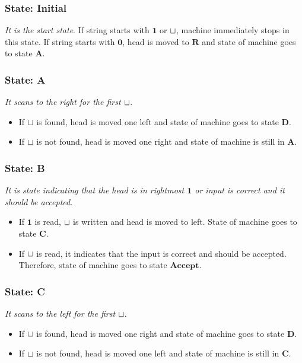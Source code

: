 \subsubsection*{State: Initial}
\label{q1-state:initial}

\textit{It is the start state}. If string starts with $\mathbf{1}$ or $\sqcup$, machine immediately stops in this state. If string starts with $\mathbf{0}$, head is moved to $\mathbf{R}$ and state of machine goes to state \hyperref[q1-state:A]{$\mathbf{A}$}.

\subsubsection*{State: A}
\label{q1-state:A}

\textit{It scans to the right for the first $\sqcup$}.
\begin{itemize}
  \item If $\sqcup$ is found, head is moved one left and state of machine goes to state \hyperref[q1-state:B]{$\mathbf{D}$}.
  \item If $\sqcup$ is not found, head is moved one right and state of machine is still in \hyperref[q1-state:A]{$\mathbf{A}$}.
\end{itemize}

\subsubsection*{State: B}
\label{q1-state:B}

\textit{It is state indicating that the head is in rightmost $\mathbf{1}$ or input is correct and it should be accepted}. 
\begin{itemize}
  \item If $\mathbf{1}$ is read, $\sqcup$ is written and head is moved to left. State of machine goes to state \hyperref[q1-state:C]{$\mathbf{C}$}.
  \item If $\sqcup$ is read, it indicates that the input is correct and should be accepted. Therefore, state of machine goes to state \hyperref[q1-state:Accept]{$\mathbf{Accept}$}.
\end{itemize}

\subsubsection*{State: C}
\label{q1-state:C}

\textit{It scans to the left for the first $\sqcup$}.
\begin{itemize}
  \item If $\sqcup$ is found, head is moved one right and state of machine goes to state \hyperref[q1-state:D]{$\mathbf{D}$}.
  \item If $\sqcup$ is not found, head is moved one left and state of machine is still in \hyperref[q1-state:C]{$\mathbf{C}$}.
\end{itemize}

